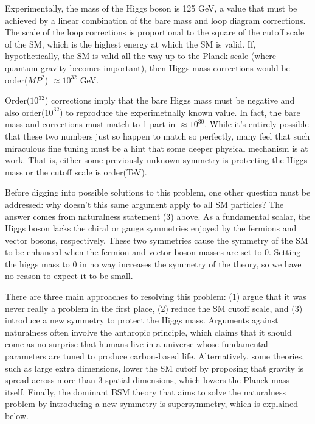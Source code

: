 \documentclass[12pt]{article}
\begin{document}
    Experimentally, the mass of the Higgs boson is 125 GeV, a value that must be achieved by a linear combination of the bare mass and loop diagram corrections. The scale of the loop corrections is proportional to the square of the cutoff scale of the SM, which is the highest energy at which the SM is valid. If, hypothetically, the SM is valid all the way up to the Planck scale (where quantum gravity becomes important), then Higgs mass corrections would be order($MP^2$) $\approx 10^{32}$ GeV.
    
     Order($10^{32}$) corrections imply that the bare Higgs mass must be negative and also order($10^{32}$) to reproduce the experimetnally known value. In fact, the bare mass and corrections must match to 1 part in $\approx 10^{30}$. While it's entirely possible that these two numbers just so happen to match so perfectly, many  feel that such miraculous fine tuning must be a hint that some deeper physical mechanism is at work. That is, either some previously unknown symmetry is protecting the Higgs mass or the cutoff scale is order(TeV).

     Before digging into possible solutions to this problem, one other question must be addressed: why doesn't this same argument apply to all SM particles? The answer comes from naturalness statement (3) above. As a fundamental scalar, the Higgs boson lacks the chiral or gauge symmetries enjoyed by the fermions and vector bosons, respectively. These two symmetries cause the symmetry of the SM to be enhanced when the fermion and vector boson masses are set to 0.  Setting the higgs mass to 0 in no way increases the symmetry of the theory, so we have no reason to expect it to be small.

     There are three main approaches to resolving this problem: (1) argue that it was never really a problem in the first place, (2) reduce the SM cutoff scale, and (3) introduce a new symmetry to protect the Higgs mass. Arguments against naturalness often involve the anthropic principle, which claims that it should come as no surprise that humans live in a universe whose fundamental parameters are tuned to produce carbon-based life. Alternatively, some theories, such as large extra dimensions, lower the SM cutoff by proposing that gravity is spread across more than 3 spatial dimensions, which lowers the Planck mass itself. Finally, the dominant BSM theory that aims to solve the naturalness problem by introducing a new symmetry is supersymmetry, which is explained below. 
\end{document}
